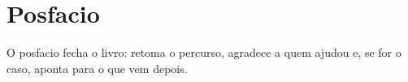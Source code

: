 %

\chapter*{Posfacio}

O posfacio fecha o livro: retoma o percurso, agradece a quem ajudou e, se for o
caso, aponta para o que vem depois.

